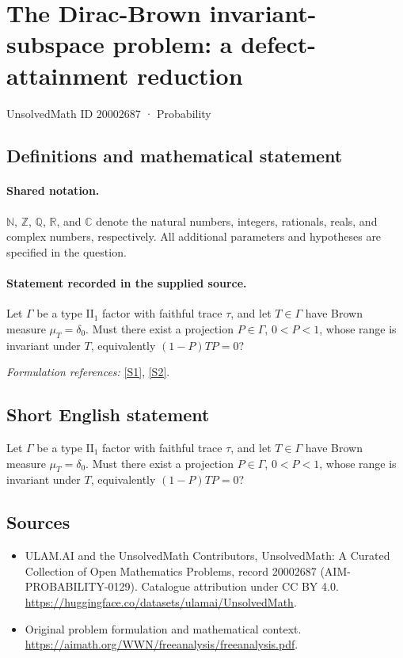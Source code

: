 \documentclass[11pt]{article}
\newcommand{\sref}[2]{\hyperlink{source:#1:#2}{[S#2]}}
\begin{document}
\setcounter{section}{20002686}
\section{The Dirac-Brown invariant-subspace problem: a defect-attainment reduction}\label{20002687}
{\small UnsolvedMath ID 20002687 · Probability}
\subsection{Definitions and mathematical statement}

\paragraph{Shared notation.}$\mathbb N$, $\mathbb Z$, $\mathbb Q$, $\mathbb R$, and $\mathbb C$ denote the natural numbers, integers, rationals, reals, and complex numbers, respectively. All additional parameters and hypotheses are specified in the question.


\paragraph{Statement recorded in the supplied source.}
Let $\Gamma$ be a type $\mathrm{II}_1$ factor with faithful trace $\tau$, and let $T\in\Gamma$ have Brown measure $\mu_T=\delta_0$. Must there exist a projection $P\in\Gamma$, $0<P<1$, whose range is invariant under $T$, equivalently $(1-P)TP=0$?
\par\smallskip\textit{Formulation references:} \sref{20002687}{1}, \sref{20002687}{2}.
\subsection{Short English statement}
Let $\Gamma$ be a type $\mathrm{II}_1$ factor with faithful trace $\tau$, and let $T\in\Gamma$ have Brown measure $\mu_T=\delta_0$. Must there exist a projection $P\in\Gamma$, $0<P<1$, whose range is invariant under $T$, equivalently $(1-P)TP=0$?
\subsection{Sources}
\begin{itemize}
\item[\hypertarget{source:20002687:1}{S1}] ULAM.AI and the UnsolvedMath Contributors, UnsolvedMath: A Curated Collection of Open Mathematics Problems, record 20002687 (AIM-PROBABILITY-0129). Catalogue attribution under CC BY 4.0.
\url{https://huggingface.co/datasets/ulamai/UnsolvedMath}.
\item[\hypertarget{source:20002687:2}{S2}] Original problem formulation and mathematical context.
\url{https://aimath.org/WWN/freeanalysis/freeanalysis.pdf}.
\end{itemize}
\label{end:20002687}
\end{document}
